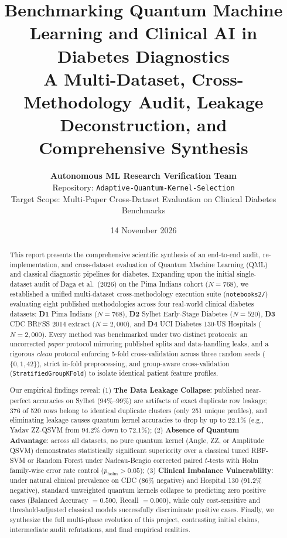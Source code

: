 \documentclass[11pt,a4paper]{article}
\title{\textbf{\LARGE Benchmarking Quantum Machine Learning and Clinical AI in Diabetes Diagnostics}\\[0.3em]
\Large A Multi-Dataset, Cross-Methodology Audit, Leakage Deconstruction, and Comprehensive Synthesis}
\author{\textbf{Autonomous ML Research Verification Team} \\
Repository: \texttt{Adaptive-Quantum-Kernel-Selection} \\
Target Scope: Multi-Paper Cross-Dataset Evaluation on Clinical Diabetes Benchmarks}
\date{14 November 2026}
\begin{document}
\maketitle

\begin{abstract}
\noindent This report presents the comprehensive scientific synthesis of an end-to-end audit, re-implementation, and cross-dataset evaluation of Quantum Machine Learning (QML) and classical diagnostic pipelines for diabetes. Expanding upon the initial single-dataset audit of Daga et al.\ (2026) on the Pima Indians cohort ($N=768$), we established a unified multi-dataset cross-methodology execution suite (\texttt{notebooks2/}) evaluating eight published methodologies across four real-world clinical diabetes datasets: \textbf{D1} Pima Indians ($N=768$), \textbf{D2} Sylhet Early-Stage Diabetes ($N=520$), \textbf{D3} CDC BRFSS 2014 extract ($N=2{,}000$), and \textbf{D4} UCI Diabetes 130-US Hospitals ($N=2{,}000$). Every method was benchmarked under two distinct protocols: an uncorrected \emph{paper} protocol mirroring published splits and data-handling leaks, and a rigorous \emph{clean} protocol enforcing 5-fold cross-validation across three random seeds ($\{0, 1, 42\}$), strict in-fold preprocessing, and group-aware cross-validation (\texttt{StratifiedGroupKFold}) to isolate identical patient feature profiles.

Our empirical findings reveal: (1) \textbf{The Data Leakage Collapse}: published near-perfect accuracies on Sylhet (94\%--99\%) are artifacts of exact duplicate row leakage; 376 of 520 rows belong to identical duplicate clusters (only 251 unique profiles), and eliminating leakage causes quantum kernel accuracies to drop by up to 22.1\% (e.g., Yadav ZZ-QSVM from 94.2\% down to 72.1\%); (2) \textbf{Absence of Quantum Advantage}: across all datasets, no pure quantum kernel (Angle, ZZ, or Amplitude QSVM) demonstrates statistically significant superiority over a classical tuned RBF-SVM or Random Forest under Nadeau-Bengio corrected paired $t$-tests with Holm family-wise error rate control ($p_{\text{holm}} > 0.05$); (3) \textbf{Clinical Imbalance Vulnerability}: under natural clinical prevalence on CDC (86\% negative) and Hospital 130 (91.2\% negative), standard unweighted quantum kernels collapse to predicting zero positive cases (Balanced Accuracy $= 0.500$, Recall $= 0.000$), while only cost-sensitive and threshold-adjusted classical models successfully discriminate positive cases. Finally, we synthesize the full multi-phase evolution of this project, contrasting initial claims, intermediate audit refutations, and final empirical realities.
\end{abstract}
\end{document}
